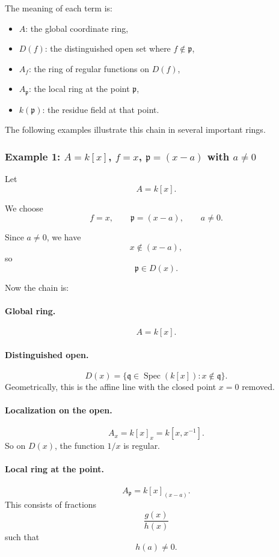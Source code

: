 \documentclass[12pt,a4paper]{article}
\theoremstyle{notespace}
\newcommand{\Spec}{\operatorname{Spec}}
\newcommand{\mf}{\mathfrak}
\theoremstyle{definition}
\begin{document}
The meaning of each term is:

\begin{itemize}
	\item \(A\): the global coordinate ring,
	\item \(D(f)\): the distinguished open set where \(f\notin \mf p\),
	\item \(A_f\): the ring of regular functions on \(D(f)\),
	\item \(A_{\mf p}\): the local ring at the point \(\mf p\),
	\item \(k(\mf p)\): the residue field at that point.
\end{itemize}

The following examples illustrate this chain in several important rings.

\subsubsection{Example 1: \(A=k[x]\), \(f=x\), \(\mf p=(x-a)\) with \(a\neq 0\)}

Let
\[
A=k[x].
\]

We choose
\[
f=x,
\qquad
\mf p=(x-a),
\qquad
a\neq 0.
\]

Since \(a\neq 0\), we have
\[
x\notin (x-a),
\]
so
\[
\mf p\in D(x).
\]

Now the chain is:

\paragraph{Global ring.}
\[
A=k[x].
\]

\paragraph{Distinguished open.}
\[
D(x)=\{\mf q\in \Spec(k[x]): x\notin \mf q\}.
\]
Geometrically, this is the affine line with the closed point \(x=0\) removed.

\paragraph{Localization on the open.}
\[
A_x=k[x]_x=k[x,x^{-1}].
\]
So on \(D(x)\), the function \(1/x\) is regular.

\paragraph{Local ring at the point.}
\[
A_{\mf p}=k[x]_{(x-a)}.
\]
This consists of fractions
\[
\frac{g(x)}{h(x)}
\]
such that
\[
h(a)\neq 0.
\]
\end{document}
